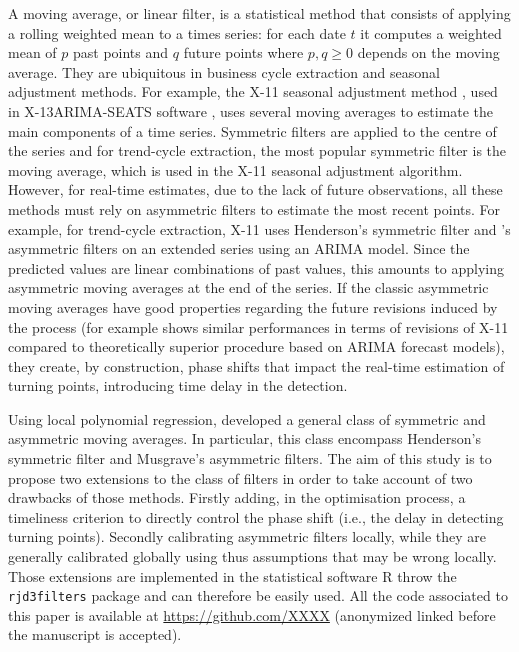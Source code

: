 \documentclass[
]{article}
\newcommand\1{\mathds{1}}
\begin{document}
A moving average, or linear filter, is a statistical method that
consists of applying a rolling weighted mean to a times series: for each
date \(t\) it computes a weighted mean of \(p\) past points and \(q\)
future points where \(p,q\geq0\) depends on the moving average. They are
ubiquitous in business cycle extraction and seasonal adjustment methods.
For example, the X-11 seasonal adjustment method
\autocite{ladiray2011seasonal}, used in X-13ARIMA-SEATS software
\autocite{x13}, uses several moving averages to estimate the main
components of a time series. Symmetric filters are applied to the centre
of the series and for trend-cycle extraction, the most popular symmetric
filter is the \textcite{henderson1916note} moving average, which is used
in the X-11 seasonal adjustment algorithm. However, for real-time
estimates, due to the lack of future observations, all these methods
must rely on asymmetric filters to estimate the most recent points. For
example, for trend-cycle extraction, X-11 uses Henderson's symmetric
filter and \textcite{musgrave1964set}'s asymmetric filters on an
extended series using an ARIMA model. Since the predicted values are
linear combinations of past values, this amounts to applying asymmetric
moving averages at the end of the series. If the classic asymmetric
moving averages have good properties regarding the future revisions
induced by the process (for example \textcite{pierce1980SA} shows
similar performances in terms of revisions of X-11 compared to
theoretically superior procedure based on ARIMA forecast models), they
create, by construction, phase shifts that impact the real-time
estimation of turning points, introducing time delay in the detection.

Using local polynomial regression, \textcite{proietti2008} developed a
general class of symmetric and asymmetric moving averages. In
particular, this class encompass Henderson's symmetric filter and
Musgrave's asymmetric filters. The aim of this study is to propose two
extensions to the \textcite{proietti2008} class of filters in order to
take account of two drawbacks of those methods. Firstly adding, in the
optimisation process, a timeliness criterion to directly control the
phase shift (i.e., the delay in detecting turning points). Secondly
calibrating asymmetric filters locally, while they are generally
calibrated globally using thus assumptions that may be wrong locally.
Those extensions are implemented in the statistical software R
\autocite{logicielr} throw the \texttt{rjd3filters} package
\autocite{rjd3filters} and can therefore be easily used. All the code
associated to this paper is available at \url{https://github.com/XXXX}
(anonymized linked before the manuscript is accepted).
\end{document}
